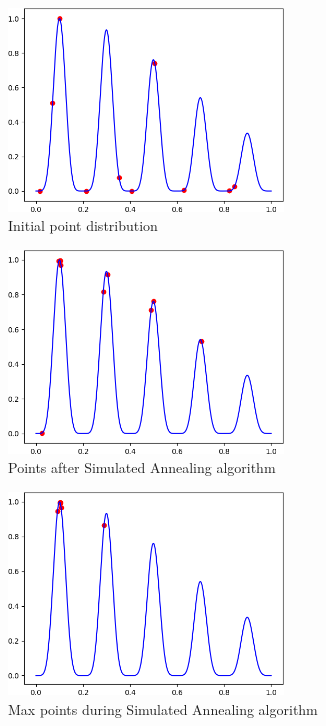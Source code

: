 \documentclass[12pt]{article}
\begin{document}
\newpage
\begin{figure}[H]
\centering
\noindent\includegraphics[width=0.65\textwidth]{images/p1_initial_sa}
\caption{Initial point distribution}
\label{fig:p1_initial_sa}
\end{figure}

\newpage
\begin{figure}[H]
\centering
\noindent\includegraphics[width=0.65\textwidth]{images/p1_final_sa}
\caption{Points after Simulated Annealing algorithm}
\label{fig:p1_final_sa}
\end{figure}

\newpage
\begin{figure}[H]
\centering
\noindent\includegraphics[width=0.65\textwidth]{images/p1_hop_sa}
\caption{Max points during Simulated Annealing algorithm}
\label{fig:p1_hop_sa}
\end{figure}
\end{document}
